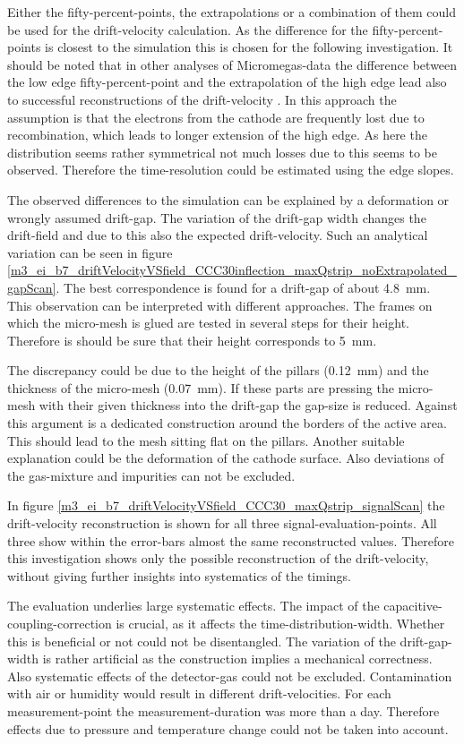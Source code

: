 \documentclass[
twoside,            %
BCOR1.4cm,          %
10pt,               %
headings=normal,    %
headsepline,        %
clearplainpage,		%
final,              %
div=14,
open=right,
bibliography=toc
]{scrreprt}
\begin{document}
Either the fifty-percent-points, the extrapolations or a combination of them could be used for the drift-velocity calculation.
As the difference for the fifty-percent-points is closest to the simulation this is chosen for the following investigation.
It should be noted that in other analyses of Micromegas-data the difference between the low edge fifty-percent-point and the extrapolation of the high edge lead also to successful reconstructions of the drift-velocity \cite{bortfeldtThesis}.
In this approach the assumption is that the electrons from the cathode are frequently lost due to recombination, which leads to longer extension of the high edge.
As here the distribution seems rather symmetrical not much losses due to this seems to be observed.
Therefore the time-resolution could be estimated using the edge slopes.

The observed differences to the simulation can be explained by a deformation or wrongly assumed drift-gap.
The variation of the drift-gap width changes the drift-field and due to this also the expected drift-velocity.
Such an analytical variation can be seen in figure \ref{m3_ei_b7_driftVelocityVSfield_CCC30inflection_maxQstrip_noExtrapolated_gapScan}.
The best correspondence is found for a drift-gap of about \SI{4.8}{mm}.
This observation can be interpreted with different approaches.
The frames on which the micro-mesh is glued are tested in several steps for their height.
Therefore is should be sure that their height corresponds to \SI{5}{mm}.

The discrepancy could be due to the height of the pillars (\SI{0.12}{mm}) and the thickness of the micro-mesh (\SI{0.07}{mm}).
If these parts are pressing the micro-mesh with their given thickness into the drift-gap the gap-size is reduced.
Against this argument is a dedicated construction around the borders of the active area.
This should lead to the mesh sitting flat on the pillars.
Another suitable explanation could be the deformation of the cathode surface.
Also deviations of the gas-mixture and impurities can not be excluded.

In figure \ref{m3_ei_b7_driftVelocityVSfield_CCC30_maxQstrip_signalScan} the drift-velocity reconstruction is shown for all three signal-evaluation-points.
All three show within the error-bars almost the same reconstructed values.
Therefore this investigation shows only the possible reconstruction of the drift-velocity, without giving further insights into systematics of the timings.

The evaluation underlies large systematic effects.
The impact of the capacitive-coupling-correction is crucial, as it affects the time-distribution-width.
Whether this is beneficial or not could not be disentangled.
The variation of the drift-gap-width is rather artificial as the construction implies a mechanical correctness.
Also systematic effects of the detector-gas could not be excluded.
Contamination with air or humidity would result in different drift-velocities.
For each measurement-point the measurement-duration was more than a day.
Therefore effects due to pressure and temperature change could not be taken into account.
\end{document}
